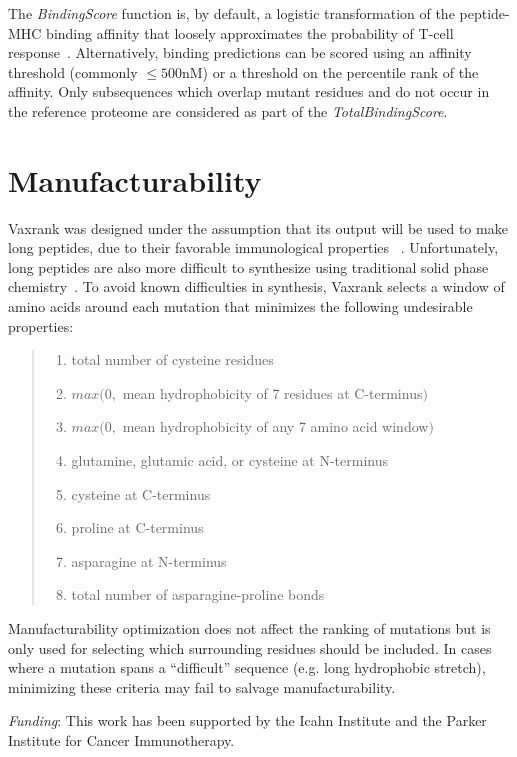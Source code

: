 \documentclass[10pt,letterpaper]{article}
\begin{document}
The {\it BindingScore} function is, by default, a logistic transformation of the peptide-MHC binding affinity that loosely approximates the probability of T-cell response~\citep{Sette1994}. Alternatively, binding predictions can be scored using an affinity threshold (commonly $\leq 500$nM) or a threshold on the percentile rank of the affinity. Only subsequences which overlap mutant residues and do not occur in the reference proteome are considered as part of the {\it TotalBindingScore}.

\section{Manufacturability}
Vaxrank was designed under the assumption that its output will be used to make long peptides, due to their favorable immunological properties ~\citep{synthetic-long-peptides}. Unfortunately, long peptides are also more difficult to synthesize using traditional solid phase chemistry~\citep{PeptideChemistry}. To avoid known difficulties in synthesis, Vaxrank selects a window of amino acids around each mutation that minimizes the following undesirable properties:

\begin{quote}
\begin{enumerate}
	\item total number of cysteine residues
	\item $max(0, $ mean hydrophobicity of 7 residues at C-terminus$)$
	\item $max(0, $ mean hydrophobicity of any 7 amino acid window$)$
	\item glutamine, glutamic acid, or cysteine at N-terminus
	\item cysteine at C-terminus
	\item proline at C-terminus
	\item asparagine at N-terminus
	\item total number of asparagine-proline bonds
\end{enumerate}
\end{quote}
Manufacturability optimization does not affect the ranking of mutations but is only used for selecting which surrounding residues should be included.  In cases where a mutation  spans a ``difficult'' sequence (e.g. long hydrophobic stretch), minimizing these criteria  may fail to salvage manufacturability.

{\it Funding}: This work has been supported by the Icahn Institute and the Parker Institute for Cancer Immunotherapy.



\end{document}
